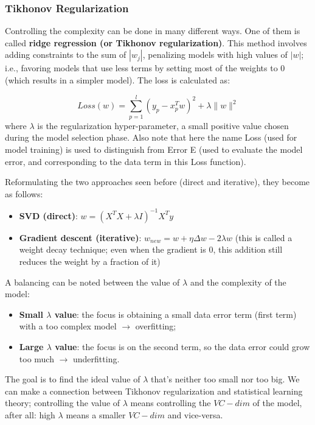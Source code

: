 \subsubsection{Tikhonov Regularization}
Controlling the complexity can be done in many different ways. One of them is called \textbf{ridge regression (or Tikhonov regularization)}. This method involves adding constraints to the sum of $|w_j|$, penalizing models with high values of $|w|$; i.e., favoring models that use less terms by setting most of the weights to 0 (which results in a simpler model). The loss is calculated as:

\begin{equation*}
    Loss(w) = \sum_{p=1}^l (y_p - x_p^Tw)^2 + \lambda \|w\|^2
\end{equation*}
where $\lambda$ is the regularization hyper-parameter, a small positive value chosen during the model selection phase. Also note that here the name Loss (used for model training) is used to distinguish from Error E (used to evaluate the model error, and corresponding to the data term in this Loss function).

Reformulating the two approaches seen before (direct and iterative), they become as follows:

\begin{itemize}
    \item \textbf{SVD (direct)}: $w = (X^TX + \lambda I)^{-1}X^Ty$

    \item \textbf{Gradient descent (iterative)}: $w_{new} = w + \eta \Delta w - 2\lambda w$ (this is called a weight decay technique; even when the gradient is 0, this addition still reduces the weight by a fraction of it)
\end{itemize}

A balancing can be noted between the value of $\lambda$ and the complexity of the model:

\begin{itemize}
    \item \textbf{Small $\lambda$ value}: the focus is obtaining a small data error term (first term) with a too complex model $\rightarrow $ overfitting;

    \item \textbf{Large $\lambda$ value}: the focus is on the second term, so the data error could grow too much $\rightarrow$ underfitting.
\end{itemize}

The goal is to find the ideal value of $\lambda$ that's neither too small nor too big. We can make a connection between Tikhonov regularization and statistical learning theory; controlling the value of $\lambda$ means controlling the $VC-dim$ of the model, after all: high $\lambda$ means a smaller $VC-dim$ and vice-versa.

